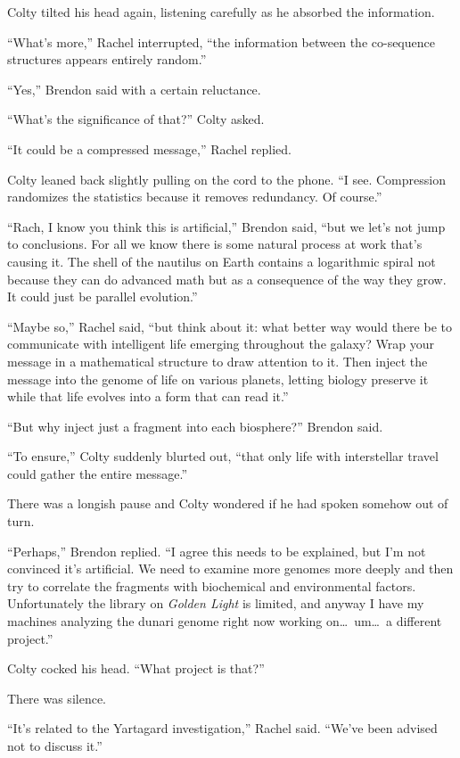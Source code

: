Colty tilted his head again, listening carefully as he absorbed the information.

``What's more,'' Rachel interrupted, ``the information between the co-sequence structures
appears entirely random.''

``Yes,'' Brendon said with a certain reluctance.

``What's the significance of that?'' Colty asked.

``It could be a compressed message,'' Rachel replied.

Colty leaned back slightly pulling on the cord to the phone. ``I see. Compression randomizes the
statistics because it removes redundancy. Of course.''

``Rach, I know you think this is artificial,'' Brendon said, ``but we let's not jump to
conclusions. For all we know there is some natural process at work that's causing it. The shell
of the nautilus on Earth contains a logarithmic spiral not because they can do advanced math but
as a consequence of the way they grow. It could just be parallel evolution.''

``Maybe so,'' Rachel said, ``but think about it: what better way would there be to communicate
with intelligent life emerging throughout the galaxy? Wrap your message in a mathematical
structure to draw attention to it. Then inject the message into the genome of life on various
planets, letting biology preserve it while that life evolves into a form that can read it.''

``But why inject just a fragment into each biosphere?'' Brendon said.

``To ensure,'' Colty suddenly blurted out, ``that only life with interstellar travel could
gather the entire message.''

There was a longish pause and Colty wondered if he had spoken somehow out of turn.

``Perhaps,'' Brendon replied. ``I agree this needs to be explained, but I'm not convinced it's
artificial. We need to examine more genomes more deeply and then try to correlate the fragments
with biochemical and environmental factors. Unfortunately the library on \textit{Golden Light}
is limited, and anyway I have my machines analyzing the dunari genome right now working
on\ldots\ um\ldots\ a different project.''

Colty cocked his head. ``What project is that?''

There was silence.

``It's related to the Yartagard investigation,'' Rachel said. ``We've been advised not to
discuss it.''


